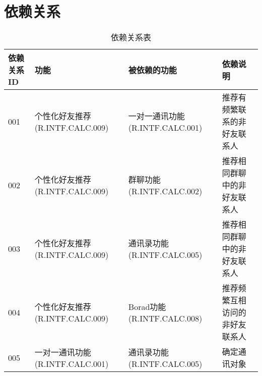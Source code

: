 \chapter{依赖关系}
\begin{table}[htbp]
    \centering
    \caption{依赖关系表} \label{tab:classification}
    \begin{tabular}{|p{6em}|p{9em}|p{9em}|p{7em}|}
            \hline%
            依赖关系ID  & 功能                                     & 被依赖的功能                              & 依赖说明 \\
            \hline%
            001        & 个性化好友推荐(R.INTF.CALC.009)           & 一对一通讯功能(R.INTF.CALC.001)            & 推荐有频繁联系的非好友联系人\\
            \hline%
            002        & 个性化好友推荐(R.INTF.CALC.009)           & 群聊功能(R.INTF.CALC.002)                 & 推荐相同群聊中的非好友联系人\\
            \hline%
            003        & 个性化好友推荐(R.INTF.CALC.009)           & 通讯录功能(R.INTF.CALC.005)               & 推荐相同群聊中的非好友联系人\\
            \hline%
            004        & 个性化好友推荐(R.INTF.CALC.009)           & Borad功能(R.INTF.CALC.008)               & 推荐频繁互相访问的非好友联系人\\
            \hline%
            005        & 一对一通讯功能(R.INTF.CALC.001)           & 通讯录功能(R.INTF.CALC.005)               & 确定通讯对象\\

\end{tabular}
\end{table}
